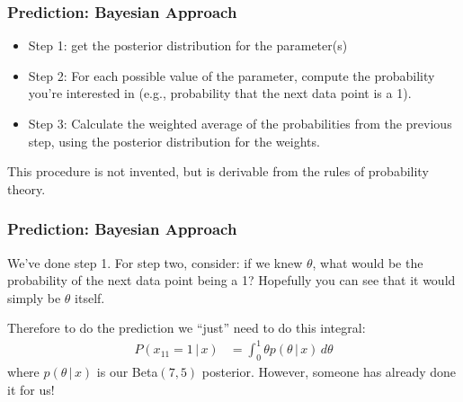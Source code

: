 \documentclass{beamer}
\newcommand{\given}{\,|\,}
\begin{document}
\begin{frame}
\frametitle{Prediction: Bayesian Approach}

\begin{itemize}
\item Step 1: get the posterior distribution for the parameter(s)\pause
\item Step 2: For each possible value of the parameter, compute the probability
you're interested in (e.g., probability that the next data point is a 1).\pause
\item Step 3: Calculate the weighted average of the probabilities from the previous
step, using the posterior distribution for the weights.\pause
\end{itemize}

This procedure is not invented, but is derivable from the rules of
probability theory.

\end{frame}

\begin{frame}
\frametitle{Prediction: Bayesian Approach}
We've done step 1. For step two, consider: if we knew $\theta$, what would
be the probability of the next data point being a 1? Hopefully you can see that
it would simply be $\theta$ itself.\pause

Therefore to do the prediction we ``just'' need to do this integral:
\begin{align}
P(x_{11} = 1 \given x) &= \int_0^1 \theta p(\theta \given x)\, d\theta
\end{align}
where $p(\theta \given x)$ is our Beta$(7, 5)$ posterior. However, someone
has already done it for us!

\end{frame}
\end{document}
